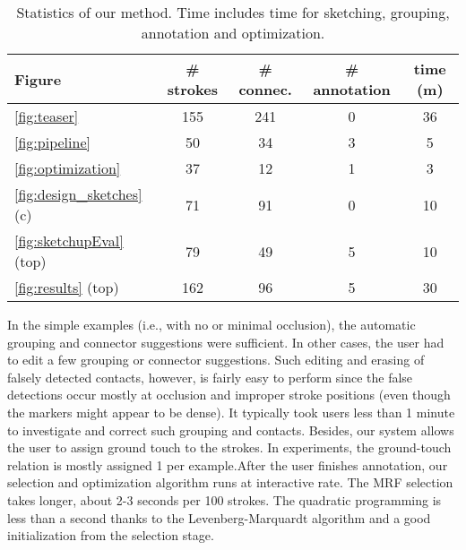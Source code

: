 \begin{table} \vnudge\centering
\small
\caption{Statistics of our method. %
Time includes time for sketching, grouping, annotation and optimization.
} \label{tbl:statistics}
\begin{tabular}{l|c|c|c|c}
\hline
  Figure & \# strokes & \# connec. & \# annotation & time (m) \\
  \hline
\ref{fig:teaser} & 155 & 241 & 0 & 36 \\
\ref{fig:pipeline} & 50 & 34 & 3 &  5 \\
\ref{fig:optimization} &  37 & 12 & 1 & 3\\
\ref{fig:design_sketches} (c) & 71 & 91 & 0 & 10 \\
\ref{fig:sketchupEval} (top) & 79 & 49 & 5 & 10 \\
\ref{fig:results} (top) &  162 & 96  & 5 & 30\\
\hline
\end{tabular}
\end{table}


In the simple examples (i.e., with no or minimal occlusion), the automatic grouping and connector suggestions were sufficient. In other cases, the user had to edit a few grouping or connector suggestions. Such editing and erasing of falsely detected contacts, however, is fairly easy to perform since the false detections occur mostly at occlusion and improper stroke positions (even though the markers might appear to be dense). It typically took users less than 1 minute to investigate and correct such grouping and contacts. Besides, our system allows the user to assign ground touch to the strokes. In experiments, the ground-touch relation is mostly assigned 1 per example.After the user finishes annotation, our selection and optimization algorithm runs at interactive rate. The MRF selection takes longer, about 2-3 seconds per 100 strokes. The quadratic programming is less than a second thanks to the Levenberg-Marquardt algorithm and a good initialization from the selection stage.





